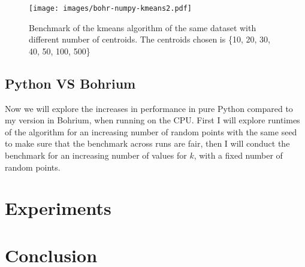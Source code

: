 \documentclass[12pt]{report}
\begin{document}
\begin{figure}[ht]
  \centering
  \texttt{[image: images/bohr-numpy-kmeans2.pdf]}
  \caption{\label{fig:bohriumvsnumpy}Benchmark of the kmeans algorithm of the same dataset with different number of centroids. The centroids chosen is \{10, 20, 30, 40, 50, 100, 500\}}
\end{figure}

\section{Python VS Bohrium}
\label{sec:pyvbohrium}
Now we will explore the increases in performance in pure Python compared to my version in Bohrium, when running on the CPU. First I will explore runtimes of the algorithm for an increasing number of random points with the same seed to make sure that the benchmark across runs are fair, then I will conduct the benchmark for an increasing number of values for $k$, with a fixed number of random points.



\chapter{Experiments}
\label{sec:experi}

\chapter{Conclusion}
\label{sec:label}



\newpage



\end{document}
